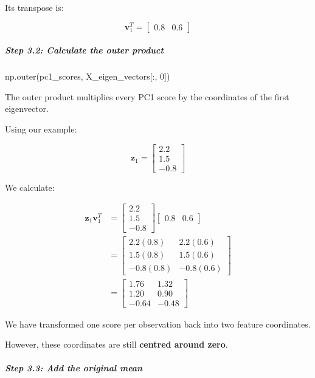 \documentclass[11pt]{article}
\newenvironment{Shaded}{}{}
\newcommand{\DecValTok}[1]{\textcolor[rgb]{0.25,0.63,0.44}{{#1}}}
\newcommand{\NormalTok}[1]{{#1}}
\begin{document}
Its transpose is:

\[
\mathbf v_1^T=
\begin{bmatrix}
0.8 & 0.6
\end{bmatrix}
\]

\subparagraph{Step 3.2: Calculate the outer
product}\label{step-3.2-calculate-the-outer-product}

\begin{Shaded}
\begin{Highlighting}[]
\NormalTok{np.outer(pc1\_scores, X\_eigen\_vectors[:, }\DecValTok{0}\NormalTok{])}
\end{Highlighting}
\end{Shaded}

The outer product multiplies every PC1 score by the coordinates of the
first eigenvector.

Using our example:

\[
\mathbf z_1=
\begin{bmatrix}
2.2\\
1.5\\
-0.8
\end{bmatrix}
\]

We calculate:

\[
\begin{aligned}
\mathbf z_1\mathbf v_1^T
&=
\begin{bmatrix}
2.2\\
1.5\\
-0.8
\end{bmatrix}
\begin{bmatrix}
0.8 & 0.6
\end{bmatrix}\\[6pt]
&=
\begin{bmatrix}
2.2(0.8) & 2.2(0.6)\\
1.5(0.8) & 1.5(0.6)\\
-0.8(0.8) & -0.8(0.6)
\end{bmatrix}\\[6pt]
&=
\boxed{
\begin{bmatrix}
1.76 & 1.32\\
1.20 & 0.90\\
-0.64 & -0.48
\end{bmatrix}
}
\end{aligned}
\]

We have transformed one score per observation back into two feature
coordinates.

However, these coordinates are still \textbf{centred around zero}.

\subparagraph{Step 3.3: Add the original
mean}\label{step-3.3-add-the-original-mean}
\end{document}
